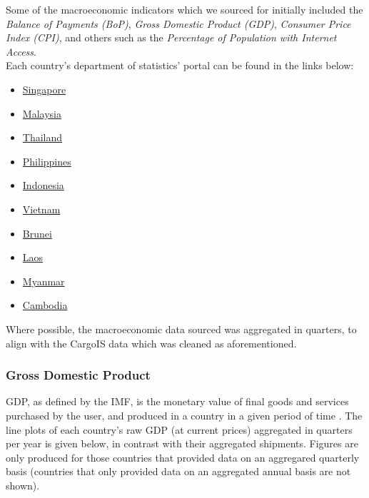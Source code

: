\documentclass{article}
\begin{document}
\noindent Some of the macroeconomic indicators which we sourced for initially included the \textit{Balance of Payments (BoP)}, \textit{Gross Domestic Product (GDP)}, \textit{Consumer Price Index (CPI)}, and others such as the \textit{Percentage of Population with Internet Access}. \\

\noindent Each country's department of statistics' portal can be found in the links below:

\begin{multicols}{2}
    \begin{itemize} 
        \item \href{https://www.singstat.gov.sg/}{Singapore}
        \item \href{https://www.data.gov.my/}{Malaysia}
        \item \href{https://www.nesdc.go.th/nesdb_en/main.php?filename=index}{Thailand}
        \item \href{https://psa.gov.ph/}{Philippines}
        \item \href{https://www.bps.go.id/}{Indonesia}
    \end{itemize}
    
    \columnbreak
    
    \begin{itemize}
        \item \href{https://www.gso.gov.vn/en/homepage/}{Vietnam}
        \item \href{https://deps.mofe.gov.bn/Theme/Home.aspx}{Brunei}
        \item \href{https://www.lsb.gov.la/en/home/}{Laos}
        \item \href{https://www.mmsis.gov.mm/}{Myanmar}
        \item \href{https://www.nis.gov.kh/index.php/km/}{Cambodia}
    \end{itemize}

\end{multicols} 

\noindent Where possible, the macroeconomic data sourced was aggregated in quarters, to align with the CargoIS data which was cleaned as aforementioned. 


\subsubsection{Gross Domestic Product} \label{GDP}
GDP, as defined by the IMF, is the monetary value of final goods and services purchased by the user, and produced in a country in a given period of time \cite{GDPdef}. The line plots of each country's raw GDP (at current prices) aggregated in quarters per year is given below, in contrast with their aggregated shipments. Figures are only produced for those countries that provided data on an aggregared quarterly basis (countries that only provided data on an aggregated annual basis are not shown). 
\end{document}
